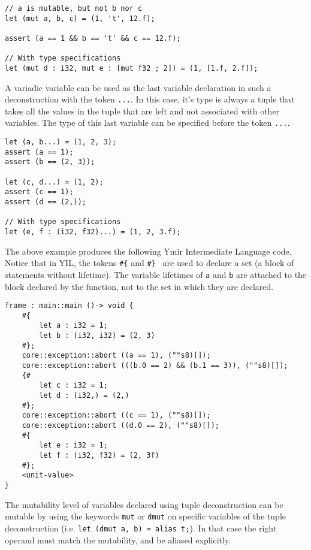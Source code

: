 \begin{lstlisting}[style=coloredverbatim]
  // a is mutable, but not b nor c
let (mut a, b, c) = (1, 't', 12.f);

assert (a == 1 && b == 't' && c == 12.f);

// With type specifications
let (mut d : i32, mut e : [mut f32 ; 2]) = (1, [1.f, 2.f]);
\end{lstlisting}

A variadic variable can be used as the last variable declaration in such a
deconstruction with the token \texttt{...}. In this case, it's type is always a
tuple that takes all the values in the tuple that are left and not associated
with other variables. The type of this last variable can be specified before the
token \texttt{...}.

\begin{lstlisting}[style=coloredverbatim]
let (a, b...) = (1, 2, 3);
assert (a == 1);
assert (b == (2, 3));

let (c, d...) = (1, 2);
assert (c == 1);
assert (d == (2,));

// With type specifications
let (e, f : (i32, f32)...) = (1, 2, 3.f);
\end{lstlisting}

The above example produces the following Ymir Intermediate Language code. Notice
that in YIL, the tokens \texttt{\#\{} and \texttt{\#\} } are used to declare a
set (a block of statements without lifetime). The variable lifetimes of \texttt{a}
and \texttt{b} are attached to the block declared by the function, not to the
set in which they are declared.

\begin{lstlisting}[style=intermediateVerb]
frame : main::main ()-> void {
    #{
        let a : i32 = 1;
        let b : (i32, i32) = (2, 3)
    #};
    core::exception::abort ((a == 1), (""s8)[]);
    core::exception::abort (((b.0 == 2) && (b.1 == 3)), (""s8)[]);
    {#
        let c : i32 = 1;
        let d : (i32,) = (2,)
    #};
    core::exception::abort ((c == 1), (""s8)[]);
    core::exception::abort ((d.0 == 2), (""s8)[]);
    #{
        let e : i32 = 1;
        let f : (i32, f32) = (2, 3f)
    #};
    <unit-value>
}
\end{lstlisting}

The mutability level of variables declared using tuple deconstruction can be
mutable by using the keywords \texttt{mut} or \texttt{dmut} on specific
variables of the tuple deconstruction (i.e. \texttt{let (dmut a, b) = alias
  t;}). In that case the right operand must match the mutability, and be aliased
explicitly.

